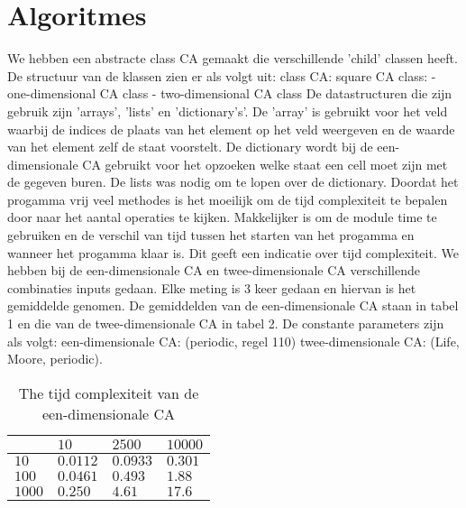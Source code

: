 \documentclass[12pt,a4paper]{article}
\begin{document}
\section*{Algoritmes}
We hebben een abstracte class CA gemaakt die verschillende 'child' classen heeft.
\newline
De structuur van de klassen zien er als volgt uit:
\newline
\phantom{.}class CA:
\newline
\phantom{.}\hspace{12pt}square CA class:
\newline
\phantom{.}\hspace{24pt}- one-dimensional CA class
\newline
\phantom{.}\hspace{24pt}- two-dimensional CA class
\vspace{6pt}
\newline
De datastructuren die zijn gebruik zijn 'arrays', 'lists' en 'dictionary's'. 
De 'array' is gebruikt voor het veld waarbij de indices de plaats van het element op het veld weergeven en 
de waarde van het element zelf de staat voorstelt.
De dictionary wordt bij de een-dimensionale CA gebruikt voor het opzoeken welke staat een cell moet zijn met de gegeven buren.
De lists was nodig om te lopen over de dictionary.
\newline
Doordat het progamma vrij veel methodes is het moeilijk om 
de tijd complexiteit te bepalen door naar het aantal operaties te kijken.
Makkelijker is om de module time te gebruiken en de verschil van tijd tussen het starten van het progamma en wanneer het progamma klaar is.
Dit geeft een indicatie over tijd complexiteit.  
We hebben bij de een-dimensionale CA en twee-dimensionale CA verschillende combinaties 
inputs gedaan. Elke meting is 3 keer gedaan en hiervan is het gemiddelde genomen.
De gemiddelden van de een-dimensionale CA staan in tabel 1 en die 
van de twee-dimensionale CA in tabel 2. De constante parameters zijn als volgt:
\newline
een-dimensionale CA: (periodic, regel 110)
\newline
twee-dimensionale CA: (Life, Moore, periodic).

\begin{table*}
    \centering
    \begin{tabular}{|m{1.2cm}|m{2.0cm}|m{2.0cm}|m{2.0cm}|}
        \hline
        $\phantom{.}$ & $10$ & $2500$ & $10000$ \\
        \hline
        $10$ & $0.0112$ & $0.0933$ & $0.301$ \\
        \hline
        $100$ & $0.0461$ & $0.493$ & $1.88$ \\
        \hline
        $1000$ & $0.250$ & $4.61$ & $17.6$ \\
        \hline
    \end{tabular}
    \caption{The tijd complexiteit van de een-dimensionale CA}
    \label{tbl:1dim}
\end{table*}
\end{document}
